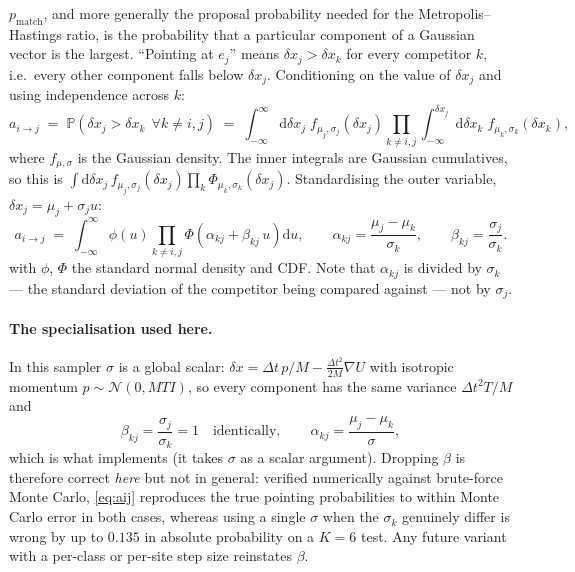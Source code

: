 \documentclass[11pt,a4paper]{article}
\newcommand{\dt}{\Delta t}
\newcommand{\gradU}{\nabla U}
\newcommand{\pmatch}{p_{\mathrm{match}}}
\newcommand{\Mass}{M}
\begin{document}
$\pmatch$, and more generally the proposal probability needed for the
Metropolis--Hastings ratio, is the probability that a particular component of
a Gaussian vector is the largest. ``Pointing at $e_{j}$'' means
$\delta x_{j} > \delta x_{k}$ for every competitor $k$, i.e.\ every other
component falls below $\delta x_{j}$. Conditioning on the value of
$\delta x_{j}$ and using independence across $k$:
\begin{equation}
  a_{i\to j}
  \;=\; \mathbb{P}\!\left(\delta x_{j} > \delta x_{k}\ \ \forall k \neq i,j\right)
  \;=\; \int_{-\infty}^{\infty}\!\!\mathrm{d}\delta x_{j}\;
        f_{\mu_{j},\sigma_{j}}(\delta x_{j})
        \prod_{k \neq i,j}
        \int_{-\infty}^{\delta x_{j}}\!\!\mathrm{d}\delta x_{k}\;
        f_{\mu_{k},\sigma_{k}}(\delta x_{k}),
  \label{eq:aij-raw}
\end{equation}
where $f_{\mu,\sigma}$ is the Gaussian density. The inner integrals are
Gaussian cumulatives, so this is
$\int \mathrm{d}\delta x_{j}\, f_{\mu_{j},\sigma_{j}}(\delta x_{j})
 \prod_{k} \Phi_{\mu_{k},\sigma_{k}}(\delta x_{j})$.
Standardising the outer variable, $\delta x_{j} = \mu_{j} + \sigma_{j}u$:
\begin{equation}
  \boxed{\;
  a_{i\to j}
  \;=\; \int_{-\infty}^{\infty}\! \phi(u)
        \prod_{k \neq i,j}
        \Phi\!\left(\alpha_{kj} + \beta_{kj}\,u\right) \mathrm{d}u,
  \qquad
  \alpha_{kj} = \frac{\mu_{j}-\mu_{k}}{\sigma_{k}},
  \qquad
  \beta_{kj} = \frac{\sigma_{j}}{\sigma_{k}}.
  \;}
  \label{eq:aij}
\end{equation}
with $\phi$, $\Phi$ the standard normal density and CDF. Note that
$\alpha_{kj}$ is divided by $\sigma_{k}$ --- the standard deviation of the
competitor being compared against --- not by $\sigma_{j}$.

\paragraph{The specialisation used here.} In this sampler $\sigma$ is a
global scalar: $\delta x = \dt\,p/\Mass - \frac{\dt^{2}}{2\Mass}\gradU$ with
isotropic momentum $p\sim\mathcal{N}(0,\Mass T I)$, so every component has the
same variance $\dt^{2}T/\Mass$ and
\begin{equation}
  \beta_{kj} = \frac{\sigma_{j}}{\sigma_{k}} = 1 \quad \text{identically},
  \qquad
  \alpha_{kj} = \frac{\mu_{j}-\mu_{k}}{\sigma},
\end{equation}
which is what  implements (it takes $\sigma$ as a
scalar argument). Dropping $\beta$ is therefore correct \emph{here} but not in
general: verified numerically against brute-force Monte Carlo,
\eqref{eq:aij} reproduces the true pointing probabilities to within Monte
Carlo error in both cases, whereas using a single $\sigma$ when the
$\sigma_{k}$ genuinely differ is wrong by up to $0.135$ in absolute
probability on a $K=6$ test. Any future variant with a per-class or per-site
step size reinstates $\beta$.
\end{document}
